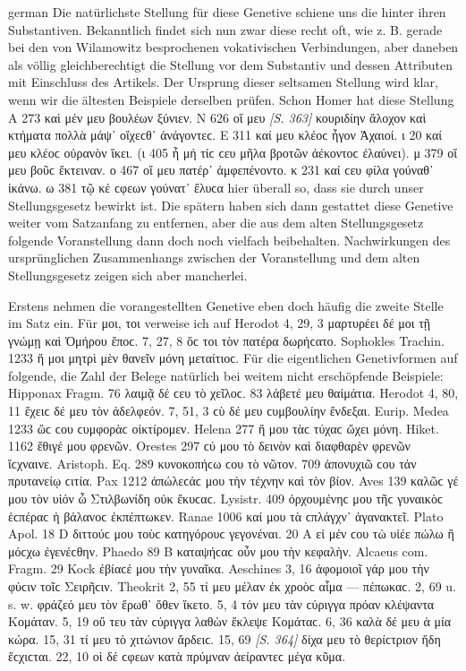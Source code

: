 \begin{otherlanguage*}{german}
Die natürlichste Stellung für diese Genetive schiene uns die hinter ihren Substantiven. Bekanntlich findet sich nun zwar diese recht oft, wie z. B. gerade bei den von Wilamowitz besprochenen vokativischen Verbindungen, aber daneben als völlig gleichberechtigt die Stellung vor dem Substantiv und dessen Attributen mit Einschluss des Artikels. Der Ursprung dieser seltsamen Stellung wird klar, wenn wir die ältesten Beispiele derselben prüfen. Schon Homer hat diese Stellung Α 273 καὶ μέν μευ βουλέων ξύνιεν. Ν 626 οἵ μευ \hypertarget{p363}{\emph{[S. 363]}}\label{p363} κουριδίην ἄλοχον καὶ κτήματα πολλὰ μάψ᾽ οἴχεϲθ᾽ ἀνάγοντεϲ. Ε 311 καί μευ κλέοϲ ἦγον Ἀχαιοί. ι 20 καί μευ κλέοϲ οὐρανὸν ἵκει. (ι 405 ἦ μή τίϲ ϲευ μῆλα βροτῶν ἀέκοντοϲ ἐλαύνει). μ 379 οἵ μευ βοῦϲ ἔκτειναν. ο 467 οἵ μευ πατέρ᾽ ἀμφεπένοντο. κ 231 καί ϲευ φίλα γούναθ᾽ ἱκάνω. ω 381 τῷ κέ ϲφεων γούνατ᾽ ἔλυϲα hier überall so, dass sie durch unser Stellungsgesetz bewirkt ist. Die spätern haben sich dann gestattet diese Genetive weiter vom Satzanfang zu entfernen, aber die aus dem alten Stellungsgesetz folgende Voranstellung dann doch noch vielfach beibehalten. Nachwirkungen des ursprünglichen Zusammenhangs zwischen der Voranstellung und dem alten Stellungsgesetz zeigen sich aber mancherlei.

Erstens nehmen die vorangestellten Genetive eben doch häufig die zweite Stelle im Satz ein. Für μοι, τοι verweise ich auf Herodot 4, 29, 3 μαρτυρέει δέ μοι τῇ γνώμῃ καὶ Ὁμήρου ἔποϲ. 7, 27, 8 ὅϲ τοι τὸν πατέρα δωρήϲατο. Sophokles Trachin. 1233 ἥ μοι μητρὶ μὲν θανεῖν μόνη μεταίτιοϲ. Für die eigentlichen Genetivformen auf folgende, die Zahl der Belege natürlich bei weitem nicht erschöpfende Beispiele: Hipponax Fragm. 76 λαιμᾷ δέ ϲευ τὸ χεῖλοϲ. 83 λάβετέ μευ θαἰμάτια. Herodot 4, 80, 11 ἔχειϲ δέ μευ τὸν ἀδελφεόν. 7, 51, 3 ϲὺ δέ μευ ϲυμβουλίην ἔνδεξαι. Eurip. Medea 1233 ὥϲ ϲου ϲυμφορὰϲ οἰκτίρομεν. Helena 277 ἥ μου τὰϲ τύχαϲ ὤχει μόνη. Hiket. 1162 ἔθιγέ μου φρενῶν. Orestes 297 ϲύ μου τὸ δεινὸν καὶ διαφθαρὲν φρενῶν ἴϲχναινε. Aristoph. Eq. 289 κυνοκοπήϲω ϲου τὸ νῶτον. 709 ἀπονυχιῶ ϲου τἀν πρυτανείῳ ϲιτία. Pax 1212 ἀπώλεϲάϲ μου τὴν τέχνην καὶ τὸν βίον. Aves 139 καλῶϲ γέ μου τὸν υἱόν ὦ Στιλβωνίδη οὐκ ἔκυϲαϲ. Lysistr. 409 ὀρχουμένηϲ μου τῆϲ γυναικὸϲ ἑϲπέραϲ ἡ βάλανοϲ ἐκπέπτωκεν. Ranae 1006 καί μου τὰ ϲπλάγχν᾽ ἀγανακτεῖ. Plato Apol. 18 D διττούϲ μου τοὺϲ κατηγόρουϲ γεγονέναι. 20 Α εἰ μέν ϲου τὼ υἱέε πώλω ἢ μόϲχω ἐγενέϲθην. \mbox{Phaedo} 89 Β καταψήϲαϲ οὖν μου τὴν κεφαλὴν. Alcaeus com. Fragm. 29 Kock ἐβίαϲέ μου τὴν γυναῖκα. Aeschines 3, 16 ἀφομοιοῖ γάρ μου τὴν φύϲιν τοῖϲ Σειρῆϲιν. Theokrit 2, 55 τί μευ μέλαν ἐκ χροὸϲ αἷμα — πέπωκαϲ. 2, 69 u. s. w. φράζεό μευ τὸν ἔρωθ᾽ ὅθεν ἵκετο. 5, 4 τόν μευ τὰν ϲύριγγα πρόαν κλέψαντα Κομάταν. 5, 19 οὔ τευ τὰν ϲύριγγα λαθὼν ἔκλεψε Κομάταϲ. 6, 36 καλὰ δέ μευ ἁ μία κώρα. 15, 31 τί μευ τὸ χιτώνιον ἄρδειϲ. 15, 69 \hypertarget{p364}{\emph{[S. 364]}}\label{p364} δίχα μευ τὸ θερίϲτριον ἤδη ἔϲχιϲται. 22, 10 οἱ δέ ϲφεων κατὰ πρύμναν ἀείραντεϲ μέγα κῦμα.


\end{otherlanguage*}
